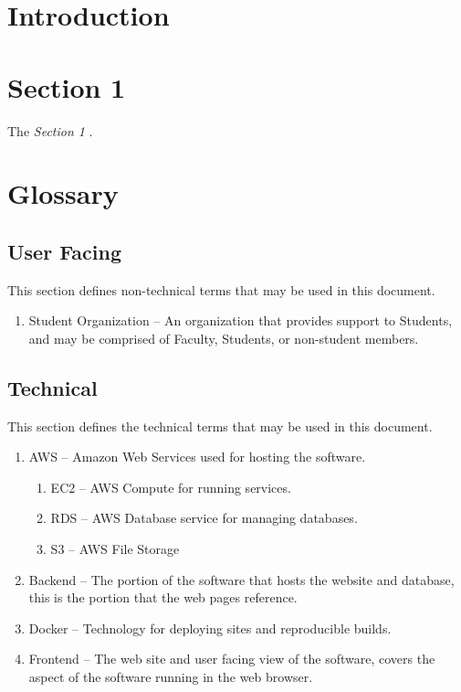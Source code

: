 \newcommand{\documentName}{Template Document}
\newcommand{\shortDocumentName}{TD}

% 




\firstPageBlock

\newpage %
\section{Introduction}

\section{Section 1}
The \textit{Section 1} .

\newpage %
\section{Glossary}
    \subsection{User Facing}
    This section defines non-technical terms that may be used in this document.
    \begin{enumerate}[leftmargin=3\parindent]
        \item Student Organization -- An organization that provides support to Students, and may be comprised of Faculty, Students, or non-student members.
    \end{enumerate}

    \subsection{Technical}
    This section defines the technical terms that may be used in this document.
    \begin{enumerate}[leftmargin=3\parindent]
        \item AWS -- Amazon Web Services used for hosting the software.
        \begin{enumerate}[leftmargin=3\parindent]
            \item EC2 -- AWS Compute for running services.
            \item RDS -- AWS Database service for managing databases.
            \item S3 -- AWS File Storage
        \end{enumerate}
        \item Backend -- The portion of the software that hosts the website and database, this is the portion that the web pages reference.
        \item Docker -- Technology for deploying sites and reproducible builds.
        \item Frontend -- The web site and user facing view of the software, covers the aspect of the software running in the web browser.
    \end{enumerate}

    \documentsGlossary




